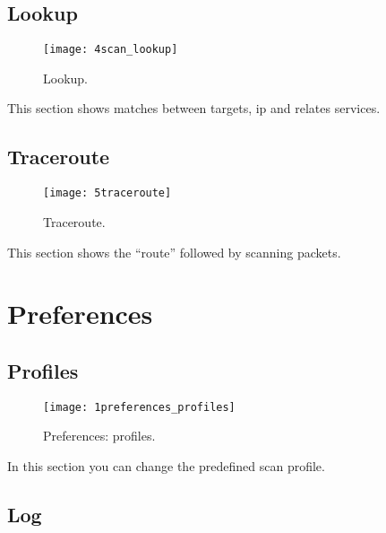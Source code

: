 \section{Lookup}
\label{sec:ContentsScanMonitorLookup}

\begin{figure}[h]
  \centering
  \texttt{[image: 4scan\_lookup]}
  \caption{Lookup.}
  \label{fig:ContentsScanMonitorLookup}
\end{figure}
This section shows matches between targets, ip and relates services.

\section{Traceroute}
\label{sec:ContentsScanMonitorTraceroute}

\begin{figure}[h]
  \centering
  \texttt{[image: 5traceroute]}
  \caption{Traceroute.}
  \label{fig:ContentsScanMonitorTraceroute}
\end{figure}
This section shows the ``route'' followed by scanning packets.

\chapter{Preferences}
\label{ch:Preferences}

\section{Profiles}
\label{sec:Preferencesprofiles}

\begin{figure}[h]
  \centering
  \texttt{[image: 1preferences\_profiles]}
  \caption{Preferences: profiles.}
  \label{fig:PreferencesProfili}
\end{figure}
In this section you can change the predefined scan profile.

\section{Log}
\label{sec:PreferencesLog}

